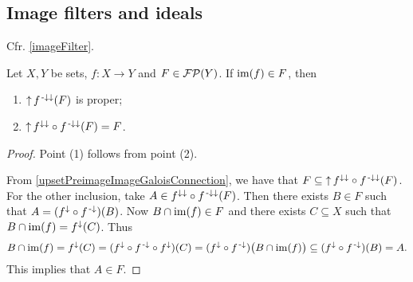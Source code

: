 \subsection{Image filters and ideals}
Cfr. \ref{imageFilter}.

\begin{lemma} \label{filterInImageIsImageFilter}
Let $X, Y$ be sets, $f: X\to Y$ and $F\in \operatorname{\mathcal{FP}}(Y)$. If $\operatorname{im}(f)\in F$, then 
\begin{enumerate}
\item $\operatorname{\uparrow} f^{{\text{\hspace{0.15em}-}\downarrow}\downarrow}(F)$ is proper;
\item $\operatorname{\uparrow} f^{\downarrow\downarrow}\circ f^{{\text{\hspace{0.15em}-}\downarrow}\downarrow}(F) = F$.
\end{enumerate}
\end{lemma}
\begin{proof}
Point (1) follows from point (2).

From \ref{upsetPreimageImageGaloisConnection}, we have that $F\subseteq \operatorname{\uparrow} f^{\downarrow\downarrow}\circ f^{{\text{\hspace{0.15em}-}\downarrow}\downarrow}(F)$. For the other inclusion, take $A\in f^{\downarrow\downarrow}\circ f^{{\text{\hspace{0.15em}-}\downarrow}\downarrow}(F)$. Then there exists $B\in F$ such that $A = (f^\downarrow\circ f^{\text{\hspace{0.15em}-}\downarrow})(B)$. Now $B\cap \operatorname{im}(f)\in F$ and there exists $C\subseteq X$ such that $B\cap \operatorname{im}(f) = f^\downarrow(C)$. Thus
\[ B\cap \operatorname{im}(f) = f^\downarrow(C) = (f^\downarrow\circ f^{\text{\hspace{0.15em}-}\downarrow}\circ f^\downarrow)(C) = (f^\downarrow\circ f^{\text{\hspace{0.15em}-}\downarrow})\big(B\cap \operatorname{im}(f)\big) \subseteq (f^\downarrow\circ f^{\text{\hspace{0.15em}-}\downarrow})(B) = A. \]
This implies that $A\in F$.
\end{proof}


